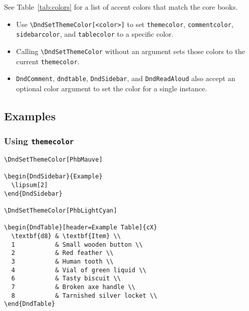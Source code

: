\documentclass[letterpaper,10pt,twoside,twocolumn,openany]{dndbook}
\begin{document}
See Table~\ref{tab:colors} for a list of accent colors that match the core books.

\begin{itemize}
  \item Use \lstinline!\DndSetThemeColor[<color>]! to set \lstinline!themecolor!, \lstinline!commentcolor!, \lstinline!sidebarcolor!, and \lstinline!tablecolor! to a specific color.
  \item Calling \lstinline!\DndSetThemeColor! without an argument sets those colors to the current \lstinline!themecolor!.
  \item \lstinline!DndComment!, \lstinline!dndtable!, \lstinline!DndSidebar!, and \lstinline!DndReadAloud! also accept an optional color argument to set the color for a single instance.
\end{itemize}

\subsection{Examples}

\subsubsection{Using \lstinline!themecolor!}

\begin{lstlisting}
\DndSetThemeColor[PhbMauve]

\begin{DndSidebar}{Example}
  \lipsum[2]
\end{DndSidebar}

\DndSetThemeColor[PhbLightCyan]

\begin{DndTable}[header=Example Table]{cX}
  \textbf{d8} & \textbf{Item} \\
  1           & Small wooden button \\
  2           & Red feather \\
  3           & Human tooth \\
  4           & Vial of green liquid \\
  6           & Tasty biscuit \\
  7           & Broken axe handle \\
  8           & Tarnished silver locket \\
\end{DndTable}
\end{lstlisting}

\begingroup
\DndSetThemeColor[PhbMauve]
\end{document}
